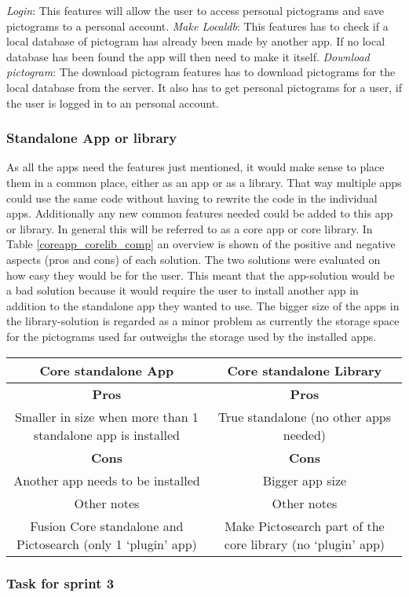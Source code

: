 \textit{Login}:
This features will allow the user to access personal pictograms and save pictograms to a personal account.
\textit{Make Localdb}:
This features has to check if a local database of pictogram has already been made by another app. If no local database has been found the app will then need to make it itself. 
\textit{Download pictogram}:
The download pictogram features has to download pictograms for the local database from the server. It also has to get personal pictograms for a user, if the user is logged in to an personal account.


\subsubsection{Standalone App or library}
As all the apps need the features just mentioned, it would make sense to place them in a common place, either as an app or as a library. That way multiple apps could use the same code without having to rewrite the code in the individual apps. Additionally any new common features needed could be added to this app or library. In general this will be referred to as a core app or core library.
In Table \ref{coreapp_corelib_comp} an overview is shown of the positive and negative aspects (pros and cons) of each solution. The two solutions were evaluated on how easy they would be for the user. This meant that the app-solution would be a bad solution because it would require the user to install another app in addition to the standalone app they wanted to use. The bigger size of the apps in the library-solution is regarded as a minor problem as currently the storage space for the pictograms used far outweighs the storage used by the installed apps.

\begin{tabular}{|c|c|}
\hline Core standalone App & Core standalone Library \\ 
\hline \textbf{Pros} & \textbf{Pros} \\ 
\hline Smaller in size when more than 1 standalone app is installed & True standalone (no other apps needed) \\ 
\hline \textbf{Cons} & \textbf{Cons} \\ 
\hline Another app needs to be installed & Bigger app size \\ 
\hline Other notes & Other notes \\ 
\hline Fusion Core standalone and Pictosearch (only 1 ‘plugin’ app) & Make Pictosearch part of the core library
(no ‘plugin’ app) \\ 
\hline 
\end{tabular} 

\subsubsection{Task for sprint 3}